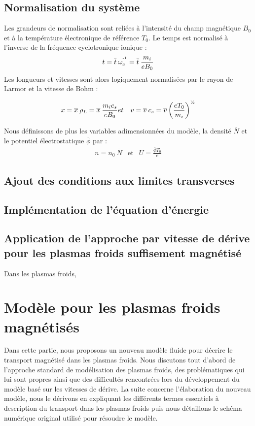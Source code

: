 \subsection{Normalisation du système}
Les grandeurs de normalisation sont reliées à l'intensité du champ magnétique
$B_0$ et à la température électronique de référence $T_0$. Le temps est
normalisé à l'inverse de la fréquence cyclotronique ionique :
\begin{equation}
t = \overline{t}\:\omega_c^{\operatorname{^{-1}}} = \overline{t}\:\frac{m_i}{eB_0}
\end{equation}
Les longueurs et vitesses sont alors logiquement normalisées par le rayon de
Larmor et la vitesse de Bohm :

\begin{eqnarray}
x = \overline{x}\:\rho_L =
\overline{x}\:\frac{m_ic_s}{eB_0} &
et &
v=\overline{v}\:c_s=\overline{v}\left(\frac{eT_0}{m_i}\right)^{\text{\textonehalf}}
\end{eqnarray}

Nous définissons de plus les variables adimensionnées du modèle, la densité
$\overline{N}$ et le potentiel électrostatique $\overline \phi$ par :
\begin{eqnarray}
n = n_0\:\overline{N} & \text{et} & U=\frac{\overline {\phi}T_0}{e}
\end{eqnarray}
\vfill

\subsection{Ajout des conditions aux limites transverses}
\subsection{Implémentation de l'équation d'énergie}
\subsection{Application de l'approche par vitesse de dérive pour les plasmas
froids suffisement magnétisé}
Dans les plasmas froids, 

\section{Modèle pour les plasmas froids magnétisés}
Dans cette partie, nous proposons un nouveau modèle fluide pour décrire le
transport magnétisé dans les plasmas froids. Nous discutons tout d'abord de
l'approche standard de modélisation des plasmas froids, des problématiques qui
lui sont propres ainsi que des difficultés rencontrées lors du développement du
modèle basé sur les vitesses de dérive. La suite concerne l'élaboration du
nouveau modèle, nous le dérivons en expliquant les différents
termes essentiels à description du transport dans les plasmas froids puis nous
détaillons le schéma numérique original utilisé pour résoudre le modèle.
